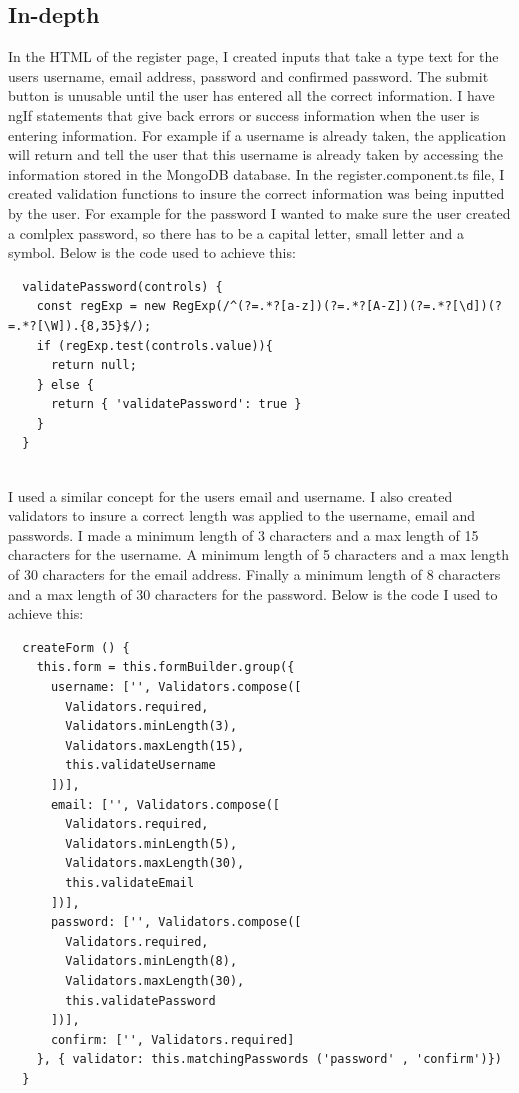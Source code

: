 \subsection{In-depth}
In the HTML of the register page, I created inputs that take a type text for the users username, email address, password and confirmed password. The submit button is unusable until the user has entered all the correct information. I have ngIf statements that give back errors or success information when the user is entering information. For example if a username is already taken, the application will return and tell the user that this username is already taken by accessing the information stored in the MongoDB database. In the register.component.ts file, I created validation functions to insure the correct information was being inputted by the user. For example for the password I wanted to make sure the user created a comlplex password, so there has to be a capital letter, small letter and a symbol. Below is the code used to achieve this:

\begin{lstlisting}
  validatePassword(controls) {
    const regExp = new RegExp(/^(?=.*?[a-z])(?=.*?[A-Z])(?=.*?[\d])(?=.*?[\W]).{8,35}$/);
    if (regExp.test(controls.value)){
      return null;
    } else {
      return { 'validatePassword': true }
    }
  }
  
\end{lstlisting}
I used a similar concept for the users email and username. I also created validators to insure a correct length was applied to the username, email and passwords. I made a minimum length of 3 characters and a max length of 15 characters for the username. A minimum length of 5 characters and a max length of 30 characters for the email address. Finally a minimum length of 8 characters and a max length of 30 characters for the password. Below is the code I used to achieve this:

\begin{lstlisting}
  createForm () {
    this.form = this.formBuilder.group({
      username: ['', Validators.compose([
        Validators.required,
        Validators.minLength(3),
        Validators.maxLength(15),
        this.validateUsername
      ])],
      email: ['', Validators.compose([
        Validators.required,
        Validators.minLength(5),
        Validators.maxLength(30),
        this.validateEmail
      ])],
      password: ['', Validators.compose([
        Validators.required,
        Validators.minLength(8),
        Validators.maxLength(30),
        this.validatePassword
      ])],
      confirm: ['', Validators.required]
    }, { validator: this.matchingPasswords ('password' , 'confirm')})
  }
  
\end{lstlisting}

